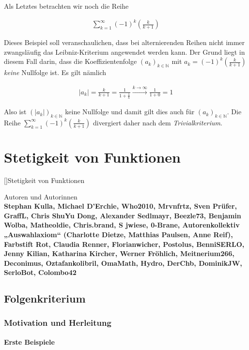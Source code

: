 \documentclass[fontsize=9pt,
               parskip=half-,
               DIV=14,
               listof=chapterentry,
               tocflat]{scrbook}
\newenvironment{authors}{\par\vspace*{\fill}\color{white}Autoren und
Autorinnen\\\bfseries}{\clearpage}
\begin{document}
Als Letztes betrachten wir noch die Reihe

\begin{align*}
\sum _{k=1}^{\infty }(-1)^{k}\left({\frac {k}{k+1}}\right)
\end{align*}

Dieses Beispiel soll veranschaulichen, dass bei alternierenden Reihen nicht immer zwangsläufig das Leibniz-Kriterium angewendet werden kann. Der Grund liegt in diesem Fall darin, dass die Koeffizientenfolge $(a_{k})_{k\in \mathbb {N} }$ mit $a_{k}=(-1)^{k}\left({\tfrac {k}{k+1}}\right)$ \emph{keine} Nullfolge ist. Es gilt nämlich

\begin{align*}
|a_{k}|={\frac {k}{k+1}}={\frac {1}{1+{\frac {1}{k}}}}{\overset {k\to \infty }{\to }}{\frac {1}{1+0}}=1
\end{align*}

Also ist $(|a_{k}|)_{k\in \mathbb {N} }$ keine Nullfolge und damit gilt dies auch für $(a_{k})_{k\in \mathbb {N} }$. Die Reihe $\sum _{k=1}^{\infty }(-1)^{k}\left({\tfrac {k}{k+1}}\right)$ divergiert daher nach dem \emph{Trivialkriterium}.

\part{Stetigkeit von Funktionen}

[]{Stetigkeit von Funktionen}\begin{authors}
Stephan Kulla, Michael D'Erchie, Who2010, Mrvnfrtz, Sven Prüfer, GraffL, Chris ShuYu Dong, Alexander Sedlmayr, Beezle73, Benjamin Wolba, Matheoldie, Chris.brand, S jwiese, 0-Brane, Autorenkollektiv „Auswahlaxiom“ (Charlotte Dietze, Matthias Paulsen, Anne Reif), Farbstift Rot, Claudia Renner, Florianwicher, Postolus, BenniSERLO, Jenny Kilian, Katharina Kircher, Werner Fröhlich, Meitnerium266, Deconimus, Oztafankolibril, OmaMath, Hydro, DerChb, DominikJW, SerloBot, Colombo42\end{authors}

\chapter{Folgenkriterium}

\section{Motivation und Herleitung}

\subsection{Erste Beispiele}
\end{document}
